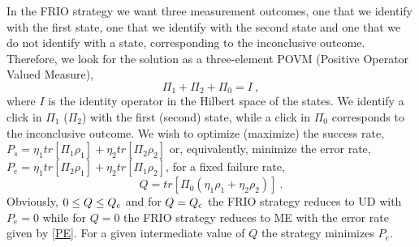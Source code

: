 \documentclass[aps,pra,twocolumn,eqsecnum,showpacs]{revtex4}
\begin{document}
In the FRIO strategy we want three measurement outcomes, one that we identify with the first state, one that we identify with the second state and one that we do not identify with a state, corresponding to the inconclusive outcome. Therefore, we look for the solution as a three-element POVM (Positive Operator Valued Measure),
\begin{equation}
\Pi_{1} + \Pi_{2} + \Pi_{0} = I \ ,
\label{POVM}
\end{equation}
where $I$ is the identity operator in the Hilbert space of the states. We identify a click in $\Pi_{1}$ ($\Pi_{2}$) with the first (second) state, while a click in $\Pi_{0}$ corresponds to the inconclusive outcome. We wish to optimize (maximize) the success rate, $P_s = \eta_1tr[\Pi_1 \rho_1] + \eta_2 tr[\Pi_2 \rho_2]$ or, equivalently, minimize the error rate, $P_e = \eta_1tr[\Pi_2 \rho_1] + \eta_2 tr[\Pi_1 \rho_2]$, for a fixed failure rate, 
\begin{equation}
Q = tr[\Pi_0(\eta_1 \rho_1 + \eta_2 \rho_2)] \ .
\label{Q}
\end{equation}
Obviously, $0 \leq Q \leq Q_{\rm c}$ and for $Q=Q_{\rm c}$ the FRIO strategy reduces to UD with $P_{e}=0$ while for $Q=0$ the FRIO strategy reduces to ME with the error rate given by \eqref{PE}. For a given intermediate value of $Q$ the strategy minimizes $P_e$.
 
\end{document}
